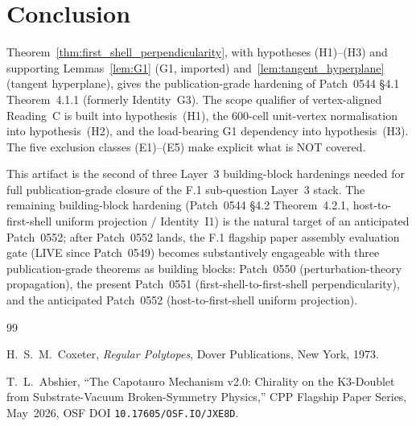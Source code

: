 \documentclass[11pt,letterpaper]{article}
\begin{document}
\section{Conclusion}\label{sec:conclusion}

Theorem~\ref{thm:first_shell_perpendicularity}, with hypotheses (H1)--(H3) and supporting Lemmas~\ref{lem:G1} (G1, imported) and~\ref{lem:tangent_hyperplane} (tangent hyperplane), gives the publication-grade hardening of Patch~0544 \S4.1 Theorem~4.1.1 (formerly Identity~G3). The scope qualifier of vertex-aligned Reading~C is built into hypothesis~(H1), the 600-cell unit-vertex normalisation into hypothesis~(H2), and the load-bearing G1 dependency into hypothesis~(H3). The five exclusion classes (E1)--(E5) make explicit what is NOT covered.

This artifact is the second of three Layer~3 building-block hardenings needed for full publication-grade closure of the F.1 sub-question Layer~3 stack. The remaining building-block hardening (Patch~0544 \S4.2 Theorem~4.2.1, host-to-first-shell uniform projection / Identity~I1) is the natural target of an anticipated Patch~0552; after Patch~0552 lands, the F.1 flagship paper assembly evaluation gate (LIVE since Patch~0549) becomes substantively engageable with three publication-grade theorems as building blocks: Patch~0550 (perturbation-theory propagation), the present Patch~0551 (first-shell-to-first-shell perpendicularity), and the anticipated Patch~0552 (host-to-first-shell uniform projection).


\begin{thebibliography}{99}

H.~S.~M.~Coxeter,
\textit{Regular Polytopes},
Dover Publications, New York, 1973.

T.~L.~Abshier,
``The Capotauro Mechanism v2.0: Chirality on the K3-Doublet from Substrate-Vacuum Broken-Symmetry Physics,''
CPP Flagship Paper Series, May~2026, OSF DOI \texttt{10.17605/OSF.IO/JXE8D}.

\end{thebibliography}
\end{document}
